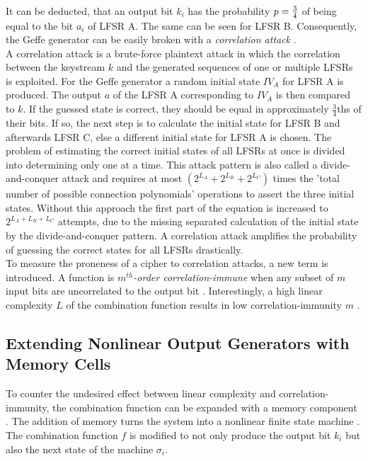 It can be deducted, that an output bit $k_i$ has the probability $\space p=\frac{3}{4} \space$ of being equal to the bit $a_i$ of LFSR A. The same can be seen for LFSR B. Consequently, the Geffe generator can be easily broken with a \emph{correlation attack} \cite[p. 104]{Pommerening.2000}. \\ 

A correlation attack is a brute-force plaintext attack in which the correlation between the keystream $k$ and the generated sequences of one or multiple LFSRs is exploited. For the Geffe generator a random initial state $IV_A$ for LFSR A is produced. The output $a$ of the LFSR A corresponding to $IV_A$ is then compared to $k$. If the guessed state is correct, they should be equal in approximately $\frac{3}{4}$ths of their bits. If so, the next step is to calculate the initial state for LFSR B and afterwards LFSR C, else a different initial state for LFSR A is chosen. The problem of estimating the correct initial states of all LFSRs at once is divided into determining only one at a time. This attack pattern is also called a divide-and-conquer attack \cite[p. 17]{Robshaw.1995} and requires at most $(2^{L_A}+2^{L_B}+2^{L_C})$ times the 'total number of possible connection polynomials' operations to assert the three initial states. Without this approach the first part of the equation is increased to $2^{L_A+L_B+L_C}$ attempts, due to the missing separated calculation of the initial state by the divide-and-conquer pattern. A correlation attack amplifies the probability of guessing the correct states for all LFSRs drastically. \cite[p. 235]{Smart.2016} \\

To measure the proneness of a cipher to correlation attacks, a new term is introduced. A function is \emph{$m^{th}$-order correlation-immune} when any subset of $m$ input bits are uncorrelated to the output bit \cite[p. 777]{Siegenthaler.1984}. Interestingly, a high linear complexity $L$ of the combination function results in low correlation-immunity $m$ \cite[p. 779]{Siegenthaler.1984}. 


\subsection{Extending Nonlinear Output Generators with Memory Cells}

To counter the undesired effect between linear complexity and correlation-immunity, the combination function can be expanded with a memory component \cite[p. 17]{Robshaw.1995}. The addition of memory turns the system into a nonlinear finite state machine \cite[p. 209]{Wu.2008}. The combination function $f$ is modified to not only produce the output bit $k_i$ but also the next state of the machine $\sigma_i$. \\ 

